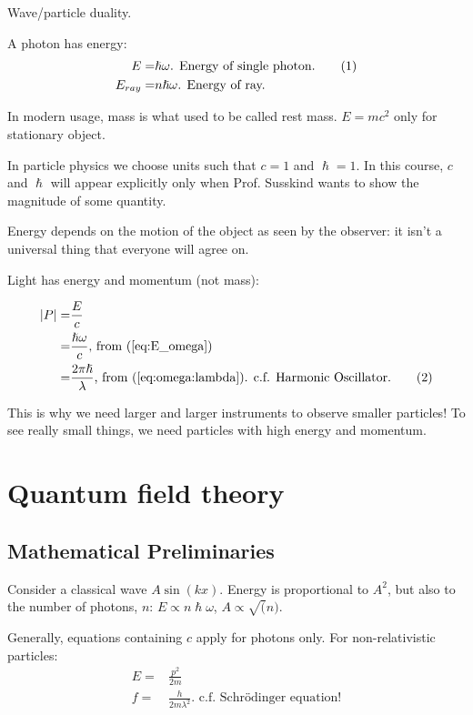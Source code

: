 \documentclass[]{article}
\newcommand\numberthis{\addtocounter{equation}{1}\tag{\theequation}}
\begin{document}
Wave/particle duality.

A photon has energy:
\begin{align*}
E=&\hslash \omega \text{. Energy of single photon.} \numberthis\label{eq:E_omega}\\
E_{ray}=&n \hslash \omega \text{. Energy of ray.}
\end{align*}
 

In modern usage, mass is what used to be called rest mass. $E = m c^2$ only for stationary object.

In particle physics we choose units such that $c=1$ and $\hslash=1$. In this course, $c$ and $\hslash$ will appear explicitly only when Prof. Susskind wants to show the magnitude of some quantity.

Energy depends on the motion of the object as seen by the observer: it isn't a universal thing that everyone will agree on.

Light has energy and momentum (not mass): 

\begin{align*}
\left|P\right|=&\frac{E}{c} \\
=&\frac{\hslash \omega}{c} \text{, from (\ref{eq:E_omega})}\\
=& \frac{2 \pi \hslash}{\lambda} \text{, from (\ref{eq:omega:lambda}). c.f. Harmonic Oscillator.}\numberthis\label{eq:P:lambda}
\end{align*}

This is why we need larger and larger instruments to observe smaller particles!
To see really small things, we need particles with high energy and momentum.


\section{Quantum field theory}

\subsection{Mathematical Preliminaries}

Consider a classical wave $A \sin(kx)$. Energy is proportional to $A^2$, but also to the number of photons, $n$: $E \propto n \hslash \omega$, $A \propto \sqrt(n)$.

Generally, equations containing $c$ apply for photons only. For non-relativistic particles:
\begin{align*}
E=&\frac{p^2}{2m}\\
f =& \frac{h}{2 m \lambda^2} \text{. c.f. Schr\"odinger equation!}
\end{align*}
\end{document}
